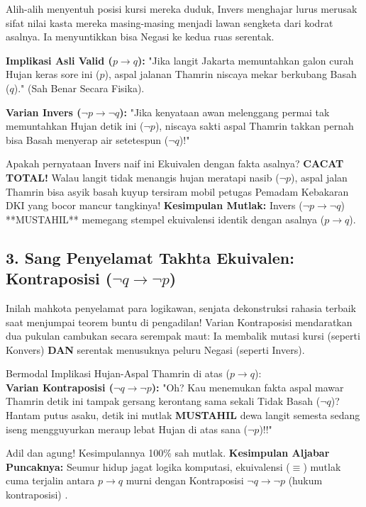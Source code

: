 Alih-alih menyentuh posisi kursi mereka duduk, Invers menghajar lurus merusak sifat nilai kasta mereka masing-masing menjadi lawan sengketa dari kodrat asalnya. Ia menyuntikkan bisa Negasi ke kedua ruas serentak.

\begin{contoh}
\textbf{Implikasi Asli Valid ($p \rightarrow q$):} "Jika langit Jakarta memuntahkan galon curah Hujan keras sore ini ($p$), aspal jalanan Thamrin niscaya mekar berkubang Basah ($q$)." (Sah Benar Secara Fisika).

\textbf{Varian Invers ($\neg p \rightarrow \neg q$):} "Jika kenyataan awan melenggang permai tak memuntahkan Hujan detik ini ($\neg p$), niscaya sakti aspal Thamrin takkan pernah bisa Basah menyerap air setetespun ($\neg q$)!" 

Apakah pernyataan Invers naif ini Ekuivalen dengan fakta asalnya? \textbf{CACAT TOTAL!} Walau langit tidak menangis hujan meratapi nasib ($\neg p$), aspal jalan Thamrin bisa asyik basah kuyup tersiram mobil petugas Pemadam Kebakaran DKI yang bocor mancur tangkinya! 
\textbf{Kesimpulan Mutlak:} Invers ($\neg p \rightarrow \neg q$) **MUSTAHIL** memegang stempel ekuivalensi identik dengan asalnya ($p \rightarrow q$). \cite{wiki_first_order_logic}
\end{contoh}

\subsection{3. Sang Penyelamat Takhta Ekuivalen: Kontraposisi ($\neg q \rightarrow \neg p$)}

Inilah mahkota penyelamat para logikawan, senjata dekonstruksi rahasia terbaik saat menjumpai teorem buntu di pengadilan! Varian Kontraposisi mendaratkan dua pukulan cambukan secara serempak maut: Ia membalik mutasi kursi (seperti Konvers) \textbf{DAN} serentak menusuknya peluru Negasi (seperti Invers).

\begin{contoh}
Bermodal Implikasi Hujan-Aspal Thamrin di atas ($p \rightarrow q$): \\
\textbf{Varian Kontraposisi ($\neg q \rightarrow \neg p$):} "Oh? Kau menemukan fakta aspal mawar Thamrin detik ini tampak gersang kerontang sama sekali Tidak Basah ($\neg q$)? Hantam putus asaku, detik ini mutlak \textbf{MUSTAHIL} dewa langit semesta sedang iseng mengguyurkan meraup lebat Hujan di atas sana ($\neg p$)!!"

Adil dan agung! Kesimpulannya 100\% sah mutlak.
\textbf{Kesimpulan Aljabar Puncaknya:} Seumur hidup jagat logika komputasi, ekuivalensi ($\equiv$) mutlak cuma terjalin antara $p \rightarrow q$ murni dengan Kontraposisi $\neg q \rightarrow \neg p$ (hukum kontraposisi) \cite{rosen2019}.
\end{contoh}

